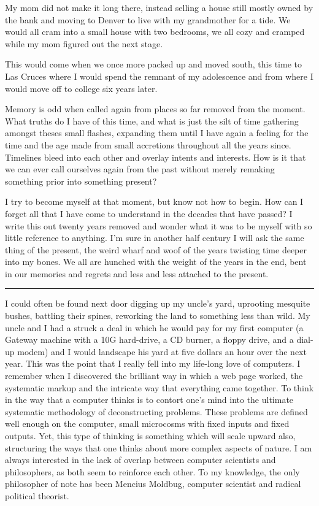 \documentclass[ebook, 10pt, openright, onecolumn]{memoir}
\newcommand*\starbreak{\fancybreak*{\Large{* * *}}}
\begin{document}
My mom did not make it long there, instead selling a house still mostly owned by the
bank and moving to Denver to live with my grandmother for a tide.  We would
all cram into a small house with two bedrooms, we all cozy and cramped while my
mom figured out the next stage.

This would come when we once more packed up and moved south, this time to Las
Cruces where I would spend the remnant of my adolescence and from where I would
move off to college six years later.  

Memory is odd when called again from places so far removed from the moment.
What truths do I have of this time, and what is just the silt of time gathering
amongst theses small flashes, expanding them until I have again a feeling for
the time and the age made from  small accretions throughout all the years
since.  Timelines bleed into each other and overlay intents and interests.  How
is it that we can ever call ourselves again from the past without merely
remaking something prior into something present?

I try to become myself at that moment, but know not how to begin.  How can I
forget all that I have come to understand in the decades that have passed?  I
write this out twenty years removed and wonder what it was to be myself with so
little reference to anything.  I'm sure in another half century I will ask the
same thing of the present, the weird wharf and woof of the years twisting time
deeper into my bones.  We all are hunched with the weight of the years in the
end, bent in our memories and regrets and less and less attached to the present.

\starbreak

I could often be found next door digging up my uncle's yard, uprooting mesquite
bushes, battling their spines, reworking the land to something less than wild.
My uncle and I had a struck a deal in which he would pay for my first computer
(a Gateway machine with a 10G hard-drive, a CD burner, a floppy drive, and a
dial-up modem) and I would landscape his yard at five dollars an hour over the
next year.  This was the point that I really fell into my life-long love of
computers.  I remember when I discovered the brilliant way in which a web page
worked, the systematic markup and the intricate way that everything came
together.  To think in the way that a computer thinks is to contort one's mind
into the ultimate systematic methodology of deconstructing problems.  These
problems are defined well enough on the computer, small microcosms with fixed
inputs and fixed outputs.  Yet, this type of thinking is something which will
scale upward also, structuring the ways that one thinks about more complex
aspects of nature.  I am always interested in the lack of overlap between
computer scientists and philosophers, as both seem to reinforce each other. To
my knowledge, the only philosopher of note has been Mencius Moldbug, computer
scientist and radical political theorist.  
\end{document}
